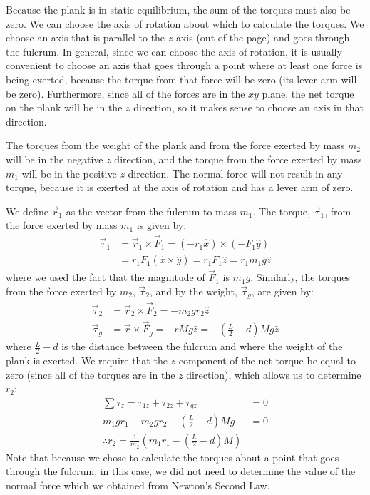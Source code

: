 \begin{example}
Because the plank is in static equilibrium, the sum of the torques must also be zero. We can choose the axis of rotation about which to calculate the torques. We choose an axis that is parallel to the $z$ axis (out of the page) and goes through the fulcrum. In general, since we can choose the axis of rotation, it is usually convenient to choose an axis that goes through a point where at least one force is being exerted, because the torque from that force will be zero (its lever arm will be zero).  Furthermore, since all of the forces are in the $xy$ plane, the net torque on the plank will be in the $z$ direction, so it makes sense to choose an axis in that direction.

The torques from the weight of the plank and from the force exerted by mass $m_2$ will be in the negative $z$ direction, and the torque from the force exerted by mass $m_1$ will be in the positive $z$ direction. The normal force will not result in any torque, because it is exerted at the axis of rotation and has a lever arm of zero. 

We define $\vec r_1$ as the vector from the fulcrum to mass $m_1$. The torque, $\vec \tau_1$, from the force exerted by mass $m_1$ is given by:
\begin{align*}
\vec \tau_1 &= \vec r_1 \times \vec F_1 = (-r_1 \hat x) \times (-F_1 \hat y) \\
&= r_1F_1(\hat x \times \hat y) = r_1F_1\hat z=r_1m_1g\hat z
\end{align*}
where we used the fact that the magnitude of $\vec F_1$ is $m_1 g$. Similarly, the torques from the force exerted by $m_2$, $\vec\tau_2$, and by the weight, $\vec\tau_g$, are given by:
\begin{align*}
\vec \tau_2 &=\vec r_2 \times \vec F_2 = -m_2 g r_2 \hat z\\
\vec \tau_g &=\vec r \times \vec F_g=-rMg\hat z = -\left(\frac{L}{2}-d\right)Mg\hat z
\end{align*}
where $\frac{L}{2}-d$ is the distance between the fulcrum and where the weight of the plank is exerted. We require that the $z$ component of the net torque be equal to zero (since all of the torques are in the $z$ direction), which allows us to determine $r_2$:
\begin{align*}
\sum \tau_z = \tau_{1z} + \tau_{2z} + \tau_{gz} &=0\\
m_1 g r_1 -m_2 g r_2 -\left(\frac{L}{2}-d\right)Mg &=0\\
\therefore r_2 = \frac{1}{m_2} \left(m_1r_1-\left(\frac{L}{2}-d\right)M\right)
\end{align*}
Note that because we chose to calculate the torques about a point that goes through the fulcrum, in this case, we did not need to determine the value of the normal force which we obtained from Newton's Second Law.


\end{example}
